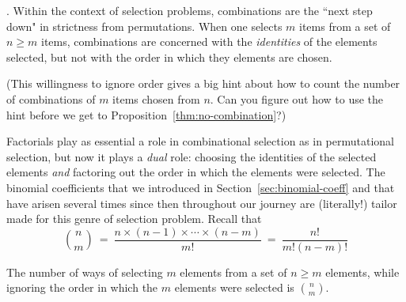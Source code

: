
\medskip

.
Within the context of selection problems, combinations are the ``next step down" in strictness from permutations.  When one selects $m$ items from a set of $n \geq m$ items, combinations are concerned with the {\em identities} of the elements selected, but not with the order in which they elements are chosen.

\smallskip

\noindent (This willingness to ignore order gives a big hint about how to count the number of
combinations of $m$ items chosen from $n$.  Can you figure out how to use the hint before
we get to Proposition~\ref{thm:no-combination}?)

\medskip

Factorials play as essential a role in combinational selection as in permutational selection, but
now it plays a {\em dual} role: choosing the identities of the selected elements {\em and} factoring out the order in which the elements were selected.  The binomial coefficients that we introduced in Section~\ref{sec:binomial-coeff} and that have arisen several times since then
throughout our journey are (literally!) tailor made for this genre of selection problem.  Recall that
\[ {n \choose m} \ = \ \frac{n \times (n-1) \times \cdots \times (n-m)}{m!} \ = \  \frac{n!}{m!(n-m)!} 
\]

\begin{prop}
\label{thm:no-combination}
The number of ways of selecting $m$ elements from a set of $n \geq m$ elements, while ignoring the order in which the $m$ elements were selected is $\displaystyle {n \choose m}$.
\end{prop}

